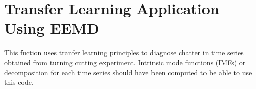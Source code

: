 \documentclass[letterpaper,10pt,english]{sphinxmanual}
\begin{document}
\label{\detokenize{EEMD:module-EEMD_Transfer_Learning}}

\section{Transfer Learning Application Using EEMD}
\label{\detokenize{EEMD:transfer-learning-application-using-eemd}}
This fuction uses tranfer learning principles to diagnose chatter in time series 
obtained from turning cutting experiment. Intrinsic mode functions (IMFs) or decomposition 
for each time series should have been computed to be able to use this code.
\end{document}
